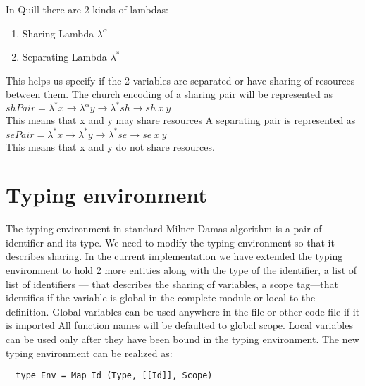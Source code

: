 In Quill there are 2 kinds of lambdas:
\begin{enumerate}
\item Sharing Lambda $\lambda^{\alpha}$
\item Separating Lambda $\lambda^{*}$
\end{enumerate}
This helps us specify if the 2 variables are separated or have sharing
of resources between them.
The church encoding of a sharing pair will be represented as\\
$shPair = \lambda^{*} x \rightarrow \lambda^{\alpha} y \rightarrow \lambda^{*} sh \rightarrow sh\ x\ y$\\
This means that x and y may share resources
A separating pair is represented as\\
$sePair = \lambda^{*} x \rightarrow \lambda^{*}y \rightarrow \lambda^{*}se \rightarrow se\ x\ y$\\
This means that x and y do not share resources.

\section{Typing environment}

The typing environment in standard Milner-Damas algorithm
is a pair of identifier and its type.
We need to modify the typing environment so that it describes sharing.
In the current implementation we have
extended the typing environment to hold 2 more entities along with the
type of the identifier, a list of list of identifiers --- that describes the sharing of variables,
a scope tag---that identifies if the variable is global in the complete module or local to the definition.
Global variables can be used anywhere in the file or other code file if it is imported
All function names will be defaulted to global scope.
Local variables can be used only after they have been bound in the typing environment.
The new typing environment can be realized as:
\begin{verbatim}
  type Env = Map Id (Type, [[Id]], Scope)
\end{verbatim}





